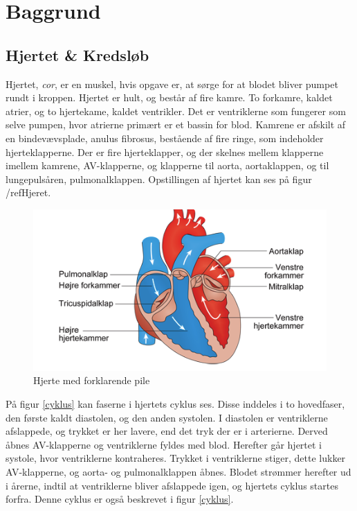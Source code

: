\chapter{Baggrund}
\section{Hjertet \& Kredsløb}
Hjertet, \textit{cor}, er en muskel, hvis opgave er, at sørge for at blodet bliver pumpet rundt i kroppen. Hjertet er hult, og består af fire kamre. To forkamre, kaldet atrier, og to hjertekame, kaldet ventrikler. Det er ventriklerne som fungerer som selve pumpen, hvor atrierne primært er et bassin for blod. Kamrene er afskilt af en bindevævsplade, anulus fibrosus, bestående af fire ringe, som indeholder hjerteklapperne. Der er fire hjerteklapper, og der skelnes mellem klapperne imellem kamrene, AV-klapperne, og klapperne til aorta, aortaklappen, og til lungepulsåren, pulmonalklappen. Opstillingen af hjertet kan ses på figur /ref{Hjeret}.\\

\begin{figure}[htb]
	\centering
	\includegraphics[width=1\textwidth]{Figurer/Fysio/Hjertet}
	\caption{Hjerte med forklarende pile \protect\cite{Hjertet}}
	\label{Hjeret} 
\end{figure}

På figur \ref{cyklus} kan faserne i hjertets cyklus ses. Disse inddeles i to hovedfaser, den første kaldt diastolen, og den anden systolen. I diastolen er ventriklerne afslappede, og trykket er her lavere, end det tryk der er i arterierne. Derved åbnes AV-klapperne og ventriklerne fyldes med blod. Herefter går hjertet i systole, hvor ventriklerne kontraheres. Trykket i ventriklerne stiger, dette lukker AV-klapperne, og aorta- og pulmonalklappen åbnes. Blodet strømmer herefter ud i årerne, indtil at ventriklerne bliver afslappede igen, og hjertets cyklus startes forfra. Denne cyklus er også beskrevet i figur \ref{cyklus}. 

